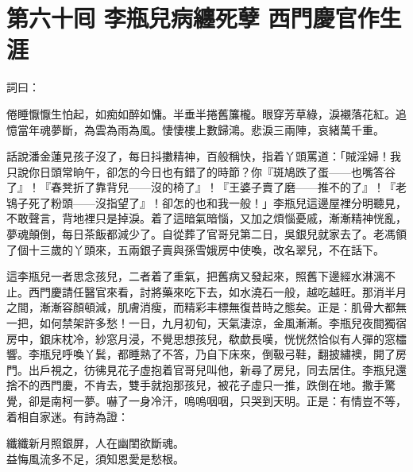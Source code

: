 
\chapter*{第六十囘 李瓶兒病纏死孽 西門慶官作生涯}


詞曰：

\begin{myquote}
倦睡懨懨生怕起，如痴如醉如慵。半垂半捲舊簾櫳。眼穿芳草綠，淚襯落花紅。追憶當年魂夢斷，為雲為雨為風。悽悽樓上數歸鴻。悲淚三兩陣，哀緒萬千重。

\end{myquote}

話說潘金蓮見孩子沒了，每日抖擻精神，百般稱快，指着丫頭罵道：「賊淫婦！我只說你日頭常晌午，卻怎的今日也有錯了的時節？你『斑鳩跌了蛋——也嘴答谷了』！『春凳折了靠背兒——沒的椅了』！『王婆子賣了磨——推不的了』！『老鴇子死了粉頭——沒指望了』！卻怎的也和我一般！」{}李瓶兒這邊屋裡分明聽見，不敢聲言，背地裡只是掉淚。着了這暗氣暗惱，又加之煩惱憂戚，漸漸精神恍亂，夢魂顛倒，每日茶飯都減少了。自從葬了官哥兒第二日，吳銀兒就家去了。老馮領了個十三歲的丫頭來，五兩銀子賣與孫雪娥房中使喚，改名翠兒，不在話下。

這李瓶兒一者思念孩兒，二者着了重氣，把舊病又發起來，照舊下邊經水淋漓不止。西門慶請任醫官來看，討將藥來吃下去，如水澆石一般，越吃越旺。那消半月之間，漸漸容顏頓減，肌膚消瘦，而精彩丰標無復昔時之態矣。正是：肌骨大都無一把，如何禁架許多愁！一日，九月初旬，天氣淒涼，金風漸漸。李瓶兒夜間獨宿房中，銀床枕冷，紗窓月浸，不覺思想孩兒，欷歔長嘆，恍恍然恰似有人彈的窓櫺響。李瓶兒呼喚丫鬂，都睡熟了不答，乃自下床來，倒靸弓鞋，翻披繡襖，開了房門。出戶視之，彷彿見花子虛抱着官哥兒叫他，新尋了房兒，同去居住。李瓶兒還捨不的西門慶，不肯去，雙手就抱那孩兒，被花子虛只一推，跌倒在地。撒手驚覺，卻是南柯一夢。嚇了一身冷汗，嗚嗚咽咽，只哭到天明。{}正是：有情豈不等，着相自家迷。有詩為證：

\begin{myquote}
纖纖新月照銀屏，人在幽閨欲斷魂。\\益悔風流多不足，須知恩愛是愁根。
\end{myquote}

